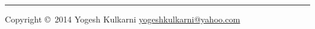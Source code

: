 % 

\usepackage{fontspec}
\setmainfont[Script=Devanagari]{Nakula}
\newfontfamily{}
\newfontfamily{}
\graphicspath{{images/}}


\raggedright
\footnotesize

\begin{multicols}{2}


\pagebreak


\rule{0.3\linewidth}{0.25pt}
\scriptsize
Copyright \copyright\ 2014 Yogesh Kulkarni
\href{http://www.yogeshkulkarni.com}{yogeshkulkarni@yahoo.com}

\end{multicols}

